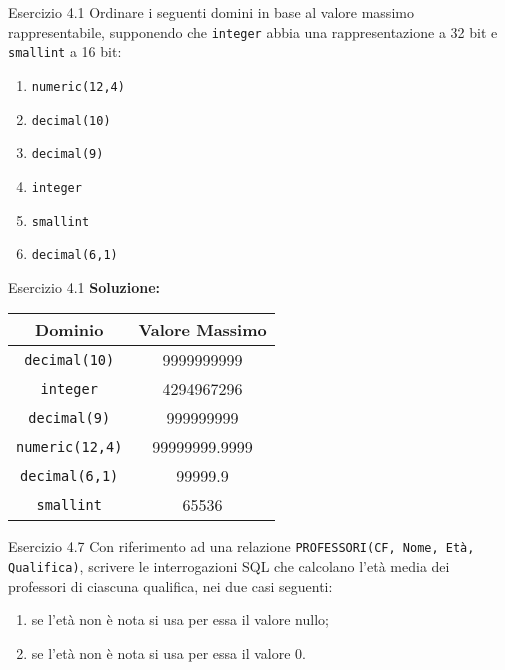 \begin{frame}{Esercizio 4.1}
         Ordinare i seguenti domini in base al valore massimo rappresentabile, supponendo che \texttt{integer} abbia una rappresentazione a 32 bit e \texttt{smallint} a 16 bit:
        \begin{enumerate}
            \item \texttt{numeric(12,4)}
            \item \texttt{decimal(10)}
            \item \texttt{decimal(9)}
            \item \texttt{integer}
            \item \texttt{smallint}
            \item \texttt{decimal(6,1)}
        \end{enumerate}
\end{frame}

\begin{frame}{Esercizio 4.1}
    \textbf{Soluzione:}
    \begin{table}[h]
        \centering
        \begin{tabular}{|c|c|}
            \hline
            Dominio & Valore Massimo \\
            \hline
            \texttt{decimal(10)} & 9999999999 \\
            \texttt{integer} & 4294967296 \\
            \texttt{decimal(9)} & 999999999 \\
            \texttt{numeric(12,4)} & 99999999.9999 \\
            \texttt{decimal(6,1)} & 99999.9 \\
            \texttt{smallint} & 65536 \\
            \hline
        \end{tabular}
    \end{table}
\end{frame}
\begin{frame}{Esercizio 4.7}
    Con riferimento ad una relazione \texttt{PROFESSORI(CF, Nome, Et\`a, Qualifica)}, scrivere le interrogazioni SQL che calcolano l'et\`a media dei professori di ciascuna qualifica, nei due casi seguenti:
    \begin{enumerate}
        \item se l'et\`a non \`e nota si usa per essa il valore nullo;
        \item se l'et\`a non \`e nota si usa per essa il valore 0.
    \end{enumerate}
\end{frame}

